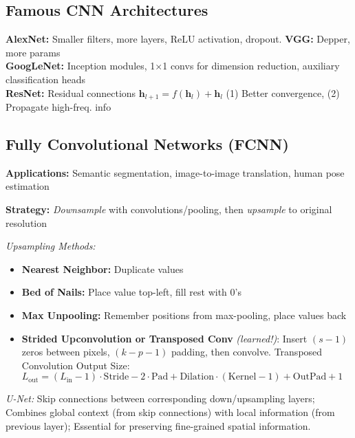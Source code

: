 \subsection{Famous CNN Architectures}

\textbf{AlexNet:} Smaller filters, more layers, ReLU activation, dropout. \textbf{VGG:} Depper, more params \\
\textbf{GoogLeNet:} Inception modules, 1×1 convs for dimension reduction, auxiliary classification heads\\
\textbf{ResNet:} Residual connections $\mathbf{h}_{l+1} = f(\mathbf{h}_l) + \mathbf{h}_l$
(1) Better convergence, (2) Propagate high-freq. info

\subsection{Fully Convolutional Networks (FCNN)}

\textbf{Applications:} Semantic segmentation, image-to-image translation, human pose estimation

\textbf{Strategy:} \textit{Downsample} with convolutions/pooling, then \textit{upsample} to original resolution

\emph{Upsampling Methods:}
\begin{itemize}
    \item \textbf{Nearest Neighbor:} Duplicate values
    \item \textbf{Bed of Nails:} Place value top-left, fill rest with $0$'s
    \item \textbf{Max Unpooling:} Remember positions from max-pooling, place values back
    \item \textbf{Strided Upconvolution or Transposed Conv} \textit{(learned!)}:  Insert $(s-1)$ zeros between pixels, $(k-p-1)$ padding, then convolve. Transposed Convolution Output Size: $L_{\text{out}} = (L_{\text{in}} - 1) \cdot \text{Stride} - 2 \cdot \text{Pad} + \text{Dilation} \cdot (\text{Kernel} - 1) + \text{OutPad} + 1$
\end{itemize}

\emph{U-Net:} Skip connections between corresponding down/upsampling layers; Combines global context (from skip connections) with local information (from previous layer); Essential for preserving fine-grained spatial information.